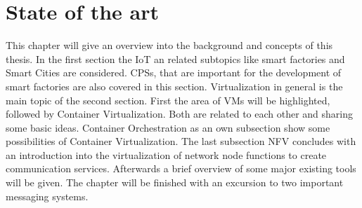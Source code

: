 


\chapter{State of the art}\label{chapter:state-of-the-art}
This chapter will give an overview into the background and concepts of this thesis.
In the first section the \ac{IoT} an related subtopics like smart factories and Smart Cities are considered.
\acp{CPS}, that are important for the development of smart factories are also covered in this section.
Virtualization in general is the main topic of the second section.
First the area of \acp{VM} will be highlighted, followed by Container Virtualization.
Both are related to each other and sharing some basic ideas.
Container Orchestration as an own subsection show some possibilities of Container Virtualization.
The last subsection \ac{NFV} concludes with an introduction into the virtualization of network node functions to create communication services.
Afterwards a brief overview of some major existing tools will be given.
The chapter will be finished with an excursion to two important messaging systems.


